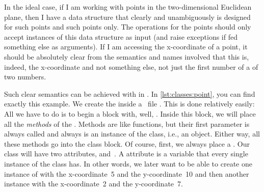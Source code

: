 In the ideal case, if I am working with points in the two-dimensional Euclidean plane, then I have a data structure that clearly and unambiguously is designed for such points and such points only.
The operations for the points should only accept instances of this data structure as input (and raise exceptions if fed something else as arguments).
If I am accessing the x\nobreakdashes-coordinate of a point, it should be absolutely clear from the semantics and names involved that this is, indeed, the x\nobreakdashes-coordinate and not something else, not just the first number of a  of two numbers.

Such clear semantics can be achieved with  in \python.
In \cref{lst:classes:point}, you can find exactly this example.
We create the  inside a \python\ file .
This is done relatively easily:
All we have to do is to begin a block with, well, .
Inside this block, we will place all the \emph{methods} of the .
Methods are like functions, but their first parameter is always called  and always is an instance of the class, i.e., an object.
Either way, all these methods go into the class block.
Of course, first, we always place a .%
%
%
%
Our class  will have two attributes,  and~.
A attribute is a variable that every single instance of the class has.
In other words, we later want to be able to create one instance of  with the x\nobreakdashes-coordinate~5 and the y\nobreakdashes-coordinate~10 and then another instance with the x\nobreakdashes-coordinate~2 and the y\nobreakdashes-coordinate~7.

